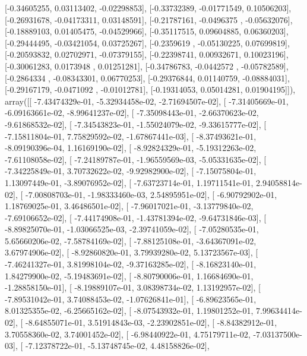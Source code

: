 \documentclass{article}
\begin{document}
       [-0.34605255,  0.03113402, -0.02298853],
       [-0.33732389, -0.01771549,  0.10506203],
       [-0.26931678, -0.04173311,  0.03148591],
       [-0.21787161, -0.0496375 , -0.05632076],
       [-0.18889103,  0.01405475, -0.04529966],
       [-0.35117515,  0.09604885,  0.06360203],
       [-0.29444495, -0.03421054,  0.03725267],
       [-0.2359619 , -0.05130225,  0.07699819],
       [-0.20593832,  0.02702971, -0.07379155],
       [-0.22398741,  0.00932671,  0.10023196],
       [-0.30061283,  0.0173948 ,  0.01251281],
       [-0.34786783, -0.0442572 , -0.05782589],
       [-0.2864334 , -0.08343301,  0.06770253],
       [-0.29376844,  0.01140759, -0.08884031],
       [-0.29167179, -0.0471092 , -0.01012781],
       [-0.19314053,  0.05014281,  0.01904195]]), array([[ -7.43474329e-01,  -5.32934458e-02,  -2.71694507e-02],
       [ -7.31405669e-01,  -6.09163661e-02,  -8.99641237e-02],
       [ -7.35098443e-01,  -2.66370623e-02,  -9.61868532e-02],
       [ -7.34543823e-01,  -1.55024079e-02,  -9.33615777e-02],
       [ -7.15811804e-01,   7.75829592e-02,  -1.67867441e-03],
       [ -8.37493621e-01,  -8.09190396e-04,   1.16169190e-02],
       [ -8.92824329e-01,  -5.19312263e-02,  -7.61108058e-02],
       [ -7.24189787e-01,  -1.96559569e-03,  -5.05331635e-02],
       [ -7.34225849e-01,   3.70732622e-02,  -9.92982900e-02],
       [ -7.15075804e-01,   1.13097449e-01,  -3.89076952e-02],
       [ -7.63723714e-01,   1.19711541e-01,   2.94058814e-02],
       [ -7.00808703e-01,  -1.98333460e-03,   2.54895951e-02],
       [ -6.90792902e-01,   1.18769025e-01,   3.46486501e-02],
       [ -7.96017021e-01,  -3.13779840e-02,  -7.69106652e-02],
       [ -7.44174908e-01,  -1.43781394e-02,  -9.64731846e-03],
       [ -8.89825070e-01,  -1.03066525e-03,  -2.39741059e-02],
       [ -7.05280535e-01,   5.65660206e-02,  -7.58784169e-02],
       [ -7.88125108e-01,  -3.64367091e-02,   3.67974906e-02],
       [ -8.92860820e-01,   3.79939280e-02,   5.13723567e-03],
       [ -7.46241327e-01,   3.81998104e-02,  -9.37163285e-02],
       [ -8.16823140e-01,   1.84279900e-02,  -5.19483691e-02],
       [ -8.80790006e-01,   1.16684690e-01,  -1.28858150e-01],
       [ -8.19889107e-01,   3.08398734e-02,   1.13192957e-02],
       [ -7.89531042e-01,   3.74088453e-02,  -1.07626841e-01],
       [ -6.89623565e-01,   8.01325355e-02,  -6.25665162e-02],
       [ -8.07543932e-01,   1.19801252e-01,   7.99634414e-02],
       [ -8.64855071e-01,   3.51914843e-03,  -2.23902851e-02],
       [ -8.84382912e-01,   3.70558360e-02,   3.74001452e-02],
       [ -6.98440922e-01,   4.75179711e-02,  -7.03137500e-03],
       [ -7.12378722e-01,  -5.13748745e-02,   4.48158826e-02],
\end{document}
